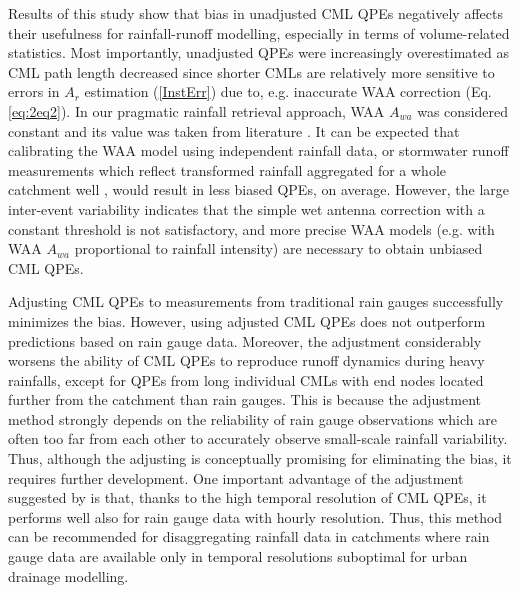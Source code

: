 \documentclass{ctuthesis}\usepackage[]{graphicx}\usepackage[]{color}
\begin{document}
Results of this study show that bias in unadjusted CML QPEs negatively affects their usefulness for rainfall-runoff modelling, especially in terms of volume-related statistics. Most importantly, unadjusted QPEs were increasingly overestimated as CML path length decreased since shorter CMLs are relatively more sensitive to errors in $A_r$ estimation (\ref{InstErr}) due to, e.g. inaccurate WAA correction (Eq. \ref{eq:2eq2}). In our pragmatic rainfall retrieval approach, WAA $A_{wa}$ was considered constant and its value was taken from literature \citep{overeemMeasuringUrbanRainfall2011}. It can be expected that calibrating the WAA model using independent rainfall data, or stormwater runoff measurements which reflect transformed rainfall aggregated for a whole catchment well \citep{pastorekCalibratingMicrowaveLink2019},  would result in less biased QPEs, on average. However, the large inter-event variability indicates that the simple wet antenna correction with a constant threshold is not satisfactory, and more precise WAA models (e.g. with WAA $A_{wa}$ proportional to rainfall intensity) are necessary to obtain unbiased CML QPEs.
 
Adjusting CML QPEs to measurements from traditional rain gauges \citep{fenclGaugeadjustedRainfallEstimates2017} successfully minimizes the bias. However, using adjusted CML QPEs does not outperform predictions based on rain gauge data. Moreover, the adjustment considerably worsens the ability of CML QPEs to reproduce runoff dynamics during heavy rainfalls, except for QPEs from long individual CMLs with end nodes located further from the catchment than rain gauges. This is because the adjustment method strongly depends on the reliability of rain gauge observations which are often too far from each other to accurately observe small-scale rainfall variability. Thus, although the adjusting is conceptually promising for eliminating the bias, it requires further development. One important advantage of the adjustment suggested by \cite{fenclGaugeadjustedRainfallEstimates2017} is that, thanks to the high temporal resolution of CML QPEs, it performs well also for rain gauge data with hourly resolution. Thus, this method can be recommended for disaggregating rainfall data in catchments where rain gauge data are available only in temporal resolutions suboptimal for urban drainage modelling.
\end{document}

